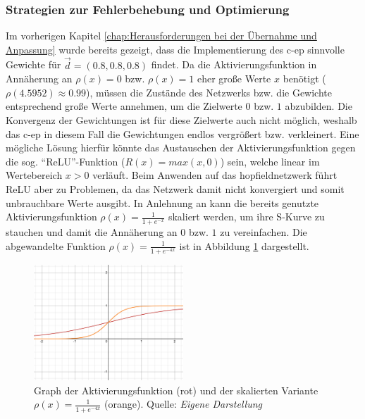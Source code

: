 \subsubsection{Strategien zur Fehlerbehebung und Optimierung}
\label{chap:Strategien zur Fehlerbehebung und Optimierung}

Im vorherigen Kapitel \ref{chap:Herausforderungen bei der Übernahme und Anpassung} wurde bereits gezeigt, dass die Implementierung des \gls{c-ep} sinnvolle Gewichte für \(\vec{d}=(0.8,0.8,0.8)\) findet. Da die Aktivierungsfunktion in Annäherung an \(\rho(x)=0\) bzw. \(\rho(x)=1\) eher große Werte \(x\) benötigt (\(\rho(4.5952)\approx0.99\)), müssen die Zustände des Netzwerks bzw. die Gewichte entsprechend große Werte annehmen, um die Zielwerte \(0\) bzw. \(1\) abzubilden. Die Konvergenz der Gewichtungen ist für diese Zielwerte auch nicht möglich, weshalb das \gls{c-ep} in diesem Fall die Gewichtungen endlos vergrößert bzw. verkleinert. Eine mögliche Lösung hierfür könnte das Austauschen der Aktivierungsfunktion gegen die sog. "`ReLU"'-Funktion (\(R(x)=max(x,0)\)) sein, welche linear im Wertebereich \(x>0\) verläuft. Beim Anwenden auf das \gls{hopfieldnetzwerk} führt ReLU aber zu Problemen, da das Netzwerk damit nicht konvergiert und somit unbrauchbare Werte ausgibt. In Anlehnung an \cite[vgl. S. 31]{Ernoult2020} kann die bereits genutzte Aktivierungsfunktion \(\rho(x)=\frac{1}{1+e^{-x}}\) skaliert werden, um ihre S-Kurve zu stauchen und damit die Annäherung an \(0\) bzw. \(1\) zu vereinfachen. Die abgewandelte Funktion \(\rho(x)=\frac{1}{1+e^{-4x}}\) ist in Abbildung \ref{fig:Graph der skalierten Aktivierungsfunktion} dargestellt.

\begin{figure}[h]
  \includegraphics[width=0.5\textwidth]{abbildungen/sigmoid_funktion_skaliert.png}
  \caption{Graph der Aktivierungsfunktion (rot) und der skalierten Variante \(\rho(x)=\frac{1}{1+e^{-4x}}\) (orange). Quelle: \textit{Eigene Darstellung}}
  \label{fig:Graph der skalierten Aktivierungsfunktion}
\end{figure}

